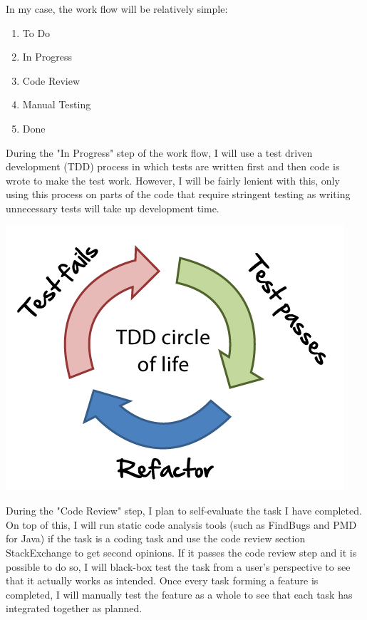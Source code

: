 \documentclass[]{report}
\begin{document}
		In my case, the work flow will be relatively simple:
		\begin{enumerate}
			\item To Do
			\item In Progress
			\item Code Review
			\item Manual Testing
			\item Done
		\end{enumerate}
		During the "In Progress" step of the work flow, I will use a test driven development (TDD) process in which tests are written first and then code is wrote to make the test work. However, I will be fairly lenient with this, only using this process on parts of the code that require stringent testing as writing unnecessary tests will take up development time. 
		
		\begin{center}
			\includegraphics[scale=0.5]{tdd-circle-of-life.png}
		\end{center}
		
		During the "Code Review" step, I plan to self-evaluate the task I have completed. On top of this, I will run static code analysis tools (such as FindBugs and PMD for Java) if the task is a coding task and use the code review section StackExchange to get second opinions. If it passes the code review step and it is possible to do so, I will black-box test the task from a user's perspective to see that it actually works as intended. Once every task forming a feature is completed, I will manually test the feature as a whole to see that each task has integrated together as planned.
		
\end{document}

